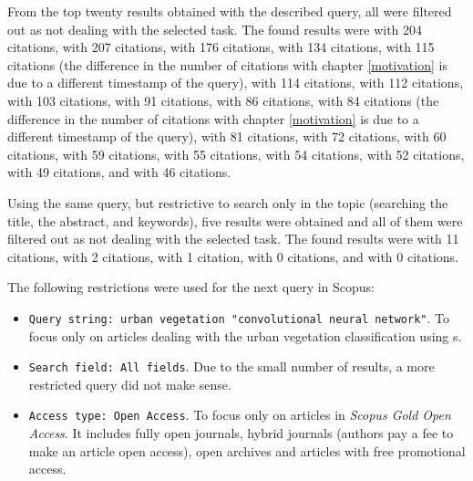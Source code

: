 \noindent From the top twenty results obtained with the described query, all were filtered out as not dealing with the selected task. The found results were \cite{cnn-traffic} with 204 citations, \cite{ir-image-fusion} with 207 citations, \cite{review-nucleus-cell} with 176 citations, \cite{spatiotemporal-rcnn-traffic} with 134 citations, \cite{review-uav-applications} with 115 citations (the difference in the number of citations with chapter \ref{motivation} is due to a different timestamp of the query), \cite{perception-planning-vehicles} with 114 citations, \cite{dl-medical-fusion-mri} with 112 citations, \cite{survey-fusion-iot-ubiquitous} with 103 citations, \cite{sl-quark-gluon-jet} with 91 citations, \cite{ml-solid-state-materials} with 86 citations, \cite{review-water-dl} with 84 citations (the difference in the number of citations with chapter \ref{motivation} is due to a different timestamp of the query), \cite{bio-inspired-computation} with 81 citations, \cite{2d-3d-image-analysis} with 72 citations, \cite{graph-cnn-chemical-reactivity} with 60 citations, \cite{dl-gravitational-wave-ligo} with 59 citations, \cite{dl-street-view-green-blue} with 55 citations, \cite{ml-biology-medicine} with 54 citations, \cite{hybrid-vehicle-viola-jones} with 52 citations, \cite{multimessenger-astrophysics} with 49 citations, and \cite{parton-shower-uncertainties} with 46 citations.

Using the same query, but restrictive to search only in the topic (searching the title, the abstract, and keywords), five results were obtained and all of them were filtered out as not dealing with the selected task. The found results were \cite{tree-detection-uav-cnn} with 11 citations, \cite{crowd-counting} with 2 citations, \cite{urban-green-quantification} with 1 citation, \cite{urban-green-obesity} with 0 citations, and \cite{cnn-lc-gaofen-2} with 0 citations.

The following restrictions were used for the next query in Scopus:

\begin{itemize}
	\item \verb|Query string: urban vegetation "convolutional neural network"|. To fo\-cus on\-ly on articles dealing with the urban vegetation classification using s.
	\item \verb|Search field: All fields|. Due to the small number of results, a more restricted query did not make sense.
	\item \verb|Access type: Open Access|. To focus only on articles in \textit{Scopus Gold Open Access}. It includes fully open journals, hybrid journals (authors pay a fee to make an article open access), open archives and articles with free promotional access.
\end{itemize}

